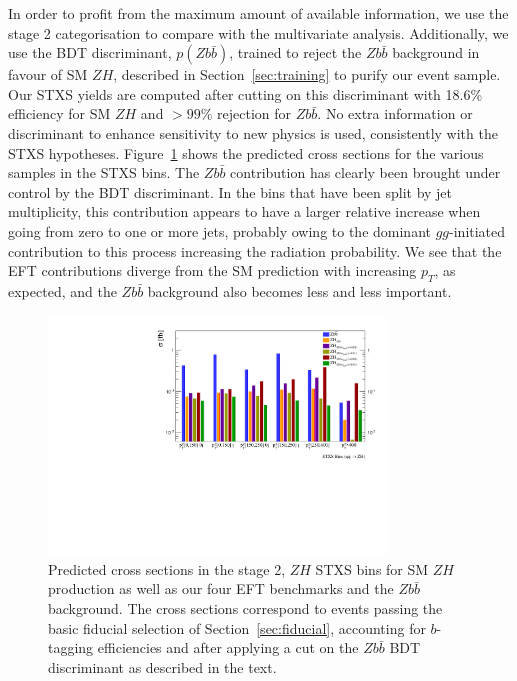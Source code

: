 %
In order to profit from the maximum amount of available information, we use the stage 2 categorisation to compare with the multivariate analysis. Additionally, we use the BDT discriminant, $p(Z b\bar{b})$, trained to reject the $Zb\bar{b}$ background in favour of SM $ZH$, described in Section~\ref{sec:training} to purify our event sample. Our STXS yields are computed after cutting on this discriminant with 18.6\% efficiency for SM $ZH$  and $> 99\%$ rejection for $Zb\bar{b}$. No extra information or discriminant to enhance sensitivity to new physics is used, consistently with the STXS hypotheses.  Figure~\ref{fig:stxs_crosssec} shows the predicted cross sections for the various samples in the STXS bins. The $Zb\bar{b}$ contribution has clearly been brought under control by the BDT discriminant. In the bins that have been split by jet multiplicity, this contribution appears to have a larger relative increase when going from zero to one or more jets, probably owing to the dominant $gg$-initiated contribution to this process increasing the radiation probability. We see that the EFT contributions diverge from the SM prediction with increasing $p_T$, as expected, and the $Zb\bar{b}$ background also becomes less and less important. 

\begin{figure}[h!]
\centering
\includegraphics[width=0.8\textwidth]{plots/STXS_comp.pdf}
\caption{
\label{fig:stxs_crosssec}
Predicted cross sections in the stage 2, $ZH$ STXS bins for SM $ZH$ production as well as our four EFT benchmarks and the $Zb\bar{b}$ background. The cross sections correspond to events passing the basic fiducial selection of Section~\ref{sec:fiducial}, accounting for $b$-tagging efficiencies and after applying a cut on the $Zb\bar{b}$ BDT discriminant as described in the text.
    }
\end{figure}






